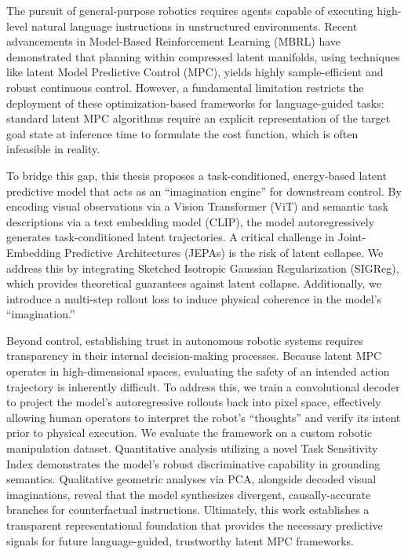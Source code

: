 The pursuit of general-purpose robotics requires agents capable of executing high-level natural language instructions in unstructured environments. Recent advancements in Model-Based Reinforcement Learning (MBRL) have demonstrated that planning within compressed latent manifolds, using techniques like latent Model Predictive Control (MPC), yields highly sample-efficient and robust continuous control. However, a fundamental limitation restricts the deployment of these optimization-based frameworks for language-guided tasks: standard latent MPC algorithms require an explicit representation of the target goal state at inference time to formulate the cost function, which is often infeasible in reality.

To bridge this gap, this thesis proposes a task-conditioned, energy-based latent predictive model that acts as an ``imagination engine'' for downstream control. By encoding visual observations via a Vision Transformer (ViT) and semantic task descriptions via a text embedding model (CLIP), the model autoregressively generates task-conditioned latent trajectories. A critical challenge in Joint-Embedding Predictive Architectures (JEPAs) is the risk of latent collapse. We address this by integrating Sketched Isotropic Gaussian Regularization (SIGReg), which provides theoretical guarantees against latent collapse. Additionally, we introduce a multi-step rollout loss to induce physical coherence in the model's ``imagination.''

Beyond control, establishing trust in autonomous robotic systems requires transparency in their internal decision-making processes. Because latent MPC operates in high-dimensional spaces, evaluating the safety of an intended action trajectory is inherently difficult. To address this, we train a convolutional decoder to project the model's autoregressive rollouts back into pixel space, effectively allowing human operators to interpret the robot's ``thoughts'' and verify its intent prior to physical execution. We evaluate the framework on a custom robotic manipulation dataset. Quantitative analysis utilizing a novel Task Sensitivity Index demonstrates the model's robust discriminative capability in grounding semantics. Qualitative geometric analyses via PCA, alongside decoded visual imaginations, reveal that the model synthesizes divergent, causally-accurate branches for counterfactual instructions. Ultimately, this work establishes a transparent representational foundation that provides the necessary predictive signals for future language-guided, trustworthy latent MPC frameworks.

